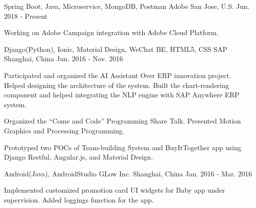 


\begin{cventries}


\cventry
{Spring Boot, Java, Microservice, MongoDB, Postman} %
{Adobe} %
{San Jose, U.S.} %
{Jun. 2018 - Present} %
{ %
\begin{cvitems}
\item {Working on Adobe Campaign integration with Adobe Cloud Platform.}
\end{cvitems}
}


\cventry
{Django(Python), Ionic, Material Design, WeChat BE, HTML5, CSS} %
{SAP} %
{Shanghai, China} %
{Jun. 2016 - Nov. 2016} %
{ %
\begin{cvitems}
\item {Participated and organized the AI Assistant Over ERP innovation project. Helped designing the architecture of the system. Built the chart-rendering component and helped integrating the NLP engine with SAP Anywhere ERP system.}
\item {Organized the “Come and Code” Programming Share Talk. Presented Motion Graphics and Processing Programming.}
\item {Prototyped two POCs of Team-building System and BuyItTogether app using Django Restful, Angular.js, and Material Design.}
\end{cvitems}
}


\cventry
{Android(Java), AndroidStudio} %
{GLow Inc.} %
{Shanghai, China} %
{Jan. 2016 - Mar. 2016} %
{ %
\begin{cvitems}
\item {Implemented customized promotion card UI widgets for Baby app under supervision. Added loggings function for the app.}
\end{cvitems}
}


\end{cventries}
